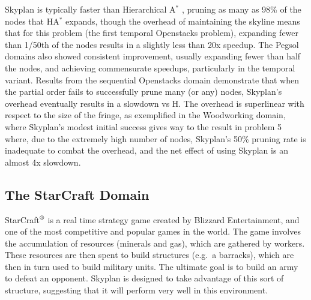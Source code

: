 \documentclass[letterpaper]{article}
\theoremstyle{plain} \newtheorem{theorem}{Theorem} \newtheorem{proposition}{Proposition} \newtheorem{lemma}{Lemma}
\theoremstyle{definition} \newtheorem{definition}{Definition} \newtheorem{conjecture}{Conjecture} \newtheorem*{example}{Example}
\theoremstyle{remark} \newtheorem*{remark}{Remark} \newtheorem*{note}{Note} \newtheorem{case}{Case}
\newcommand{\Astar}{A$^*$ }
\begin{document}
Skyplan is typically faster than Hierarchical \Astar, pruning as many as 98\% of the nodes that H\Astar
expands, though the overhead of maintaining the skyline means that for this problem (the first temporal
Openstacks problem), expanding fewer than 1/50th of the nodes results in a slightly less than 20x speedup. The
Pegsol domains also showed consistent improvement, usually expanding fewer than half the nodes, and achieving
commensurate speedups, particularly in the temporal variant. Results from the sequential Openstacks domain
demonstrate that when the partial order fails to successfully prune many (or any) nodes, Skyplan's overhead
eventually results in a slowdown vs H\AStar. The overhead is superlinear with respect to the size of the
fringe, as exemplified in the Woodworking domain, where Skyplan's modest initial success gives way to the
result in problem 5 where, due to the extremely high number of nodes, Skyplan's 50\% pruning rate is inadequate
to combat the overhead, and the net effect of using Skyplan is an almost 4x slowdown.

\subsection{The StarCraft Domain}

StarCraft$^\textrm{\textregistered}$ is a real time strategy game
created by Blizzard Entertainment, and one of the most competitive
and popular games in the world. The game involves the accumulation
of resources (minerals and gas), which are gathered by workers.
These resources are then spent to build structures (e.g.\ a barracks),
which are then in turn used to build military units. The ultimate goal is
to build an army to defeat an opponent. 
Skyplan is designed to take advantage of this sort of structure,
suggesting that it will perform very well in this environment.
\end{document}
